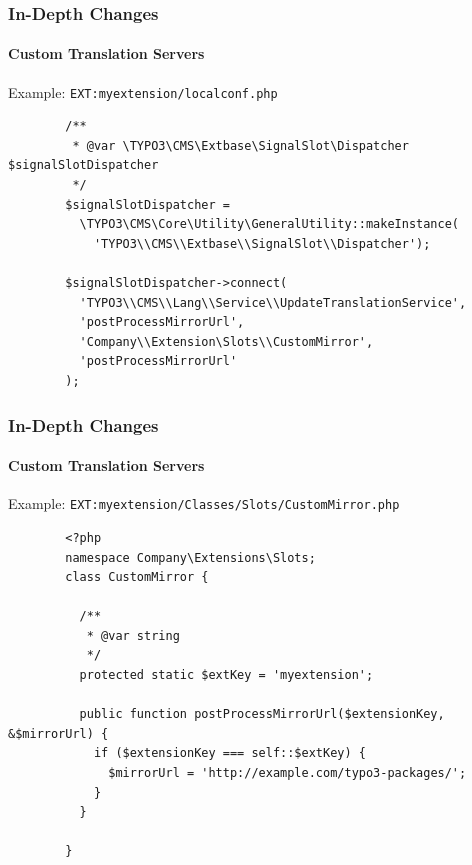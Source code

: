 
\begin{frame}[fragile]
	\frametitle{In-Depth Changes}
	\framesubtitle{Custom Translation Servers}

	Example: \texttt{EXT:myextension/localconf.php}

	\lstset{
		basicstyle=\tiny\ttfamily
	}

	\begin{lstlisting}
		/**
		 * @var \TYPO3\CMS\Extbase\SignalSlot\Dispatcher $signalSlotDispatcher
		 */
		$signalSlotDispatcher =
		  \TYPO3\CMS\Core\Utility\GeneralUtility::makeInstance(
		    'TYPO3\\CMS\\Extbase\\SignalSlot\\Dispatcher');

		$signalSlotDispatcher->connect(
		  'TYPO3\\CMS\\Lang\\Service\\UpdateTranslationService',
		  'postProcessMirrorUrl',
		  'Company\\Extension\Slots\\CustomMirror',
		  'postProcessMirrorUrl'
		);
	\end{lstlisting}

\end{frame}


\begin{frame}[fragile]
	\frametitle{In-Depth Changes}
	\framesubtitle{Custom Translation Servers}

	Example: \texttt{EXT:myextension/Classes/Slots/CustomMirror.php}

	\lstset{
		basicstyle=\tiny\ttfamily
	}

	\begin{lstlisting}
		<?php
		namespace Company\Extensions\Slots;
		class CustomMirror {

		  /**
		   * @var string
		   */
		  protected static $extKey = 'myextension';

		  public function postProcessMirrorUrl($extensionKey, &$mirrorUrl) {
		    if ($extensionKey === self::$extKey) {
		      $mirrorUrl = 'http://example.com/typo3-packages/';
		    }
		  }

		}
	\end{lstlisting}

\end{frame}


